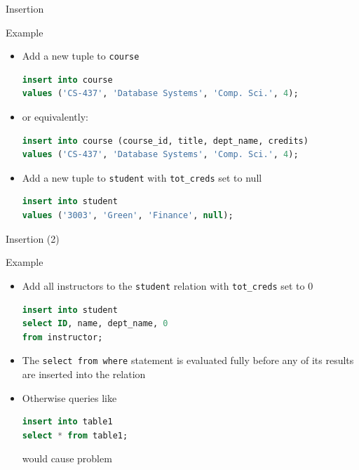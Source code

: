 \documentclass[aspectratio=169, xcolor=dvipsnames]{beamer}
\begin{document}
\begin{frame}[fragile]{Insertion}
    \begin{exampleblock}{Example}
        \begin{itemize}[<+->]
            \item Add a new tuple to \texttt{course}
            \begin{lstlisting}[language=SQL]
insert into course 
values ('CS-437', 'Database Systems', 'Comp. Sci.', 4);
            \end{lstlisting}
            \item or equivalently:
            \begin{lstlisting}[language=SQL]
insert into course (course_id, title, dept_name, credits) 
values ('CS-437', 'Database Systems', 'Comp. Sci.', 4);
            \end{lstlisting}
            \item Add a new tuple to \texttt{student} with \texttt{tot\_creds} set to null
            \begin{lstlisting}[language=SQL]
insert into student 
values ('3003', 'Green', 'Finance', null);
            \end{lstlisting}
        \end{itemize}
    \end{exampleblock}
\end{frame}

\begin{frame}[fragile]{Insertion (2)}
    \begin{exampleblock}{Example}
        \begin{itemize}[<+->]
            \item Add all instructors to the \texttt{student} relation with \texttt{tot\_creds} set to 0
            \begin{lstlisting}[language=SQL]
insert into student 
select ID, name, dept_name, 0 
from instructor;
            \end{lstlisting}
            \item The \texttt{select from where} statement is evaluated fully before any of its results are inserted into the relation
            \item Otherwise queries like
            \begin{lstlisting}[language=SQL]
insert into table1 
select * from table1;
            \end{lstlisting}
            would cause problem
        \end{itemize}
    \end{exampleblock}
\end{frame}
\end{document}
